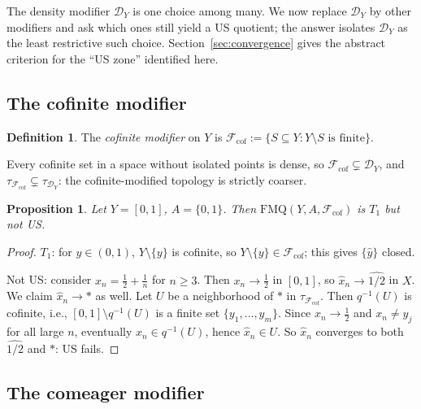 \documentclass[11pt]{article}
\newtheorem{proposition}[theorem]{Proposition}
\theoremstyle{definition}
\newtheorem{definition}[theorem]{Definition}
\theoremstyle{remark}
\begin{document}
The density modifier $\mathcal{D}_Y$ is one choice among many.
We now replace $\mathcal{D}_Y$ by other modifiers and ask which ones
still yield a US quotient; the answer isolates $\mathcal{D}_Y$ as the
least restrictive such choice.
Section~\ref{sec:convergence} gives the abstract criterion for the
``US zone'' identified here.

\subsection{The cofinite modifier}

\begin{definition}\label{def:cofinite}
The \emph{cofinite modifier} on $Y$ is
$\mathcal{F}_{\mathrm{cof}} := \{S \subseteq Y : Y \setminus S \text{ is finite}\}$.
\end{definition}

Every cofinite set in a space without isolated points is dense,
so $\mathcal{F}_{\mathrm{cof}} \subsetneq \mathcal{D}_Y$, and
$\tau_{\mathcal{F}_{\mathrm{cof}}} \subsetneq \tau_{\mathcal{D}_Y}$: the cofinite-modified
topology is strictly coarser.

\begin{proposition}\label{prop:cofinite}
Let $Y = [0,1]$, $A = \{0,1\}$. Then $\mathrm{FMQ}(Y, A, \mathcal{F}_{\mathrm{cof}})$ is
$T_1$ but not US.
\end{proposition}

\begin{proof}
$T_1$: for $y \in (0,1)$, $Y \setminus \{y\}$ is cofinite, so
$Y \setminus \{y\} \in \mathcal{F}_{\mathrm{cof}}$; this gives $\{\hat{y}\}$ closed.

Not US: consider $x_n = \frac{1}{2} + \frac{1}{n}$ for $n \geq 3$. Then $x_n \to \frac{1}{2}$
in $[0,1]$, so $\hat{x}_n \to \widehat{1/2}$ in $X$. We claim $\hat{x}_n \to \ast$ as well.
Let $U$ be a neighborhood of $\ast$ in $\tau_{\mathcal{F}_{\mathrm{cof}}}$. Then $q^{-1}(U)$
is cofinite, i.e., $[0,1] \setminus q^{-1}(U)$ is a finite set $\{y_1, \ldots, y_m\}$.
Since $x_n \to \frac{1}{2}$ and $x_n \neq y_j$ for all large $n$,
eventually $x_n \in q^{-1}(U)$, hence $\hat{x}_n \in U$. So $\hat{x}_n$ converges to both
$\widehat{1/2}$ and $\ast$: US fails.
\end{proof}

\subsection{The comeager modifier}
\end{document}
